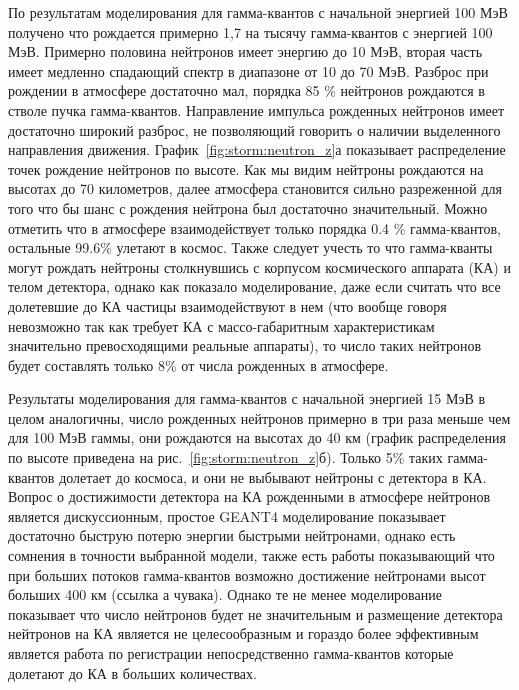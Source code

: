 По результатам моделирования для гамма-квантов с начальной энергией 100 МэВ получено что рождается примерно 1,7 на тысячу гамма-квантов с энергией 100 МэВ. Примерно половина нейтронов имеет энергию до 10 МэВ, вторая часть имеет медленно спадающий спектр в диапазоне от 10 до 70 МэВ. Разброс при рождении в атмосфере достаточно мал, порядка 85 \% нейтронов рождаются в стволе пучка гамма-квантов. Направление импульса рожденных нейтронов имеет достаточно широкий разброс, не позволяющий говорить о наличии выделенного направления движения. График~\ref{fig:storm:neutron_z}а показывает распределение точек рождение нейтронов по высоте. Как мы видим нейтроны рождаются на высотах до 70 километров, далее атмосфера становится сильно разреженной для того что бы шанс с рождения нейтрона был достаточно значительный. Можно отметить что в атмосфере взаимодействует только порядка 0.4 \% гамма-квантов, остальные 99.6\% улетают в космос. Также следует учесть то что гамма-кванты могут рождать нейтроны столкнувшись с корпусом космического аппарата (КА) и телом детектора, однако как показало моделирование, даже если считать что все долетевшие до КА частицы взаимодействуют в нем (что вообще говоря невозможно так как требует КА с массо-габаритным характеристикам значительно превосходящими реальные аппараты), то число таких нейтронов будет составлять только 8\% от числа рожденных в атмосфере.

Результаты моделирования для гамма-квантов с начальной энергией 15 МэВ в целом аналогичны, число рожденных нейтронов примерно в три раза меньше чем для 100 МэВ гаммы, они рождаются на высотах до 40 км (график распределения по высоте приведена на рис.~\ref{fig:storm:neutron_z}б). Только 5\% таких гамма-квантов долетает до космоса, и они не выбывают нейтроны с детектора в КА. Вопрос о достижимости детектора на КА рожденными в атмосфере нейтронов  является дискуссионным, простое GEANT4 моделирование показывает достаточно быструю потерю энергии быстрыми нейтронами, однако есть сомнения в точности выбранной модели, также есть работы показывающий что при больших потоков гамма-квантов возможно достижение нейтронами высот больших 400 км (ссылка а чувака). Однако те не менее моделирование показывает что число нейтронов будет не значительным и размещение детектора нейтронов на КА является не целесообразным и гораздо более эффективным является работа по  регистрации непосредственно гамма-квантов которые долетают до КА в больших количествах.
